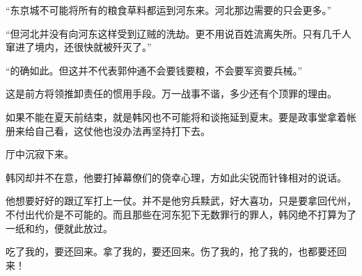 “东京城不可能将所有的粮食草料都运到河东来。河北那边需要的只会更多。”

“但河北并没有向河东这样受到辽贼的洗劫。更不用说百姓流离失所。只有几千人窜进了境内，还很快就被歼灭了。”

“的确如此。但这并不代表郭仲通不会要钱要粮，不会要军资要兵械。”

这是前方将领推卸责任的惯用手段。万一战事不谐，多少还有个顶罪的理由。

如果不能在夏天前结束，就是韩冈也不可能将和谈拖延到夏末。要是政事堂拿着帐册来给自己看，这仗他也没办法再坚持打下去。

厅中沉寂下来。

韩冈却并不在意，他要打掉幕僚们的侥幸心理，方如此尖锐而针锋相对的说话。

他想要好好的跟辽军打上一仗。并不是他穷兵黩武，好大喜功，只是要拿回代州，不付出代价是不可能的。而且那些在河东犯下无数罪行的罪人，韩冈绝不打算为了一纸和约，便就此放过。

吃了我的，要还回来。拿了我的，要还回来。伤了我的，抢了我的，也都要还回来！
